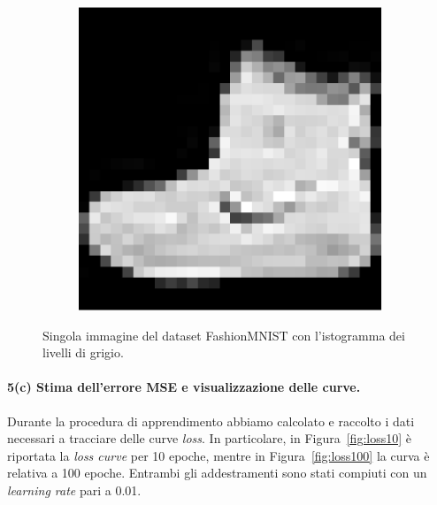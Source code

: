 \documentclass[a4paper,12pt]{article}
\begin{document}
\begin{figure}[htp]
    \centering
\begin{subfigure}{.3\textwidth}
    \centering
    \includegraphics[width=.5\linewidth]{histogram-pic.eps}
\end{subfigure}%
\begin{subfigure}{.7\textwidth}
    \centering
\end{subfigure}

    \caption{Singola immagine del dataset FashionMNIST con l'istogramma dei livelli di grigio.}
    \label{fig:istogramma}
\end{figure}


\newpage 
\paragraph{5(c) Stima dell'errore MSE e visualizzazione delle curve.} Durante la procedura di apprendimento abbiamo calcolato e raccolto i dati necessari a tracciare delle curve \emph{loss}. In particolare, in Figura~\vref{fig:loss10} è riportata la \emph{loss curve} per 10 epoche, mentre in Figura~\vref{fig:loss100} la curva è relativa a 100 epoche. Entrambi gli addestramenti sono stati compiuti con un \emph{learning rate} pari a 0.01.
\end{document}
